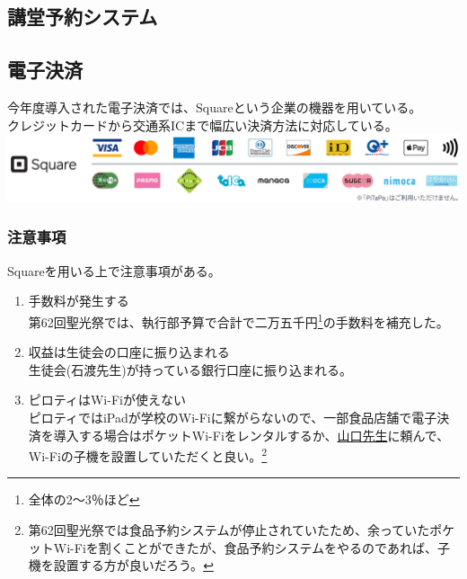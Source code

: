 \documentclass[dvipdfmx,jb5]{jarticle}
\newcommand{\mail}[2]{\href{mailto:#2}{#1}}
\begin{document}
 \subsection{講堂予約システム}
 \subsection{電子決済}\label{sec:電子決済}
 今年度導入された電子決済では、Squareという企業の機器を用いている。\\
 クレジットカードから交通系ICまで幅広い決済方法に対応している。\\
 \includegraphics[scale=0.15]{assets/square_availability.png}
 \subsubsection{注意事項}
 Squareを用いる上で注意事項がある。
 \begin{enumerate}[注意1]
  \item 手数料が発生する\\
  第62回聖光祭では、執行部予算で合計で二万五千円\footnote{全体の2〜3％ほど}の手数料を補充した。
  \item 収益は生徒会の口座に振り込まれる\\
  生徒会(石渡先生)が持っている銀行口座に振り込まれる。
  \item ピロティはWi-Fiが使えない\\
  ピロティではiPadが学校のWi-Fiに繋がらないので、一部食品店舗で電子決済を導入する場合はポケットWi-Fiをレンタルするか、\mail{山口先生}{yuri.ayamguchi@seiko.ac.jp}に頼んで、Wi-Fiの子機を設置していただくと良い。\footnote{第62回聖光祭では食品予約システムが停止されていたため、余っていたポケットWi-Fiを割くことができたが、食品予約システムをやるのであれば、子機を設置する方が良いだろう。}
 \end{enumerate}
\end{document}
